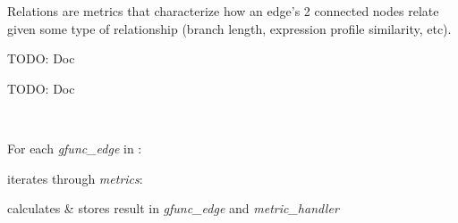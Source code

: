 \documentclass[letterpaper,10pt,english]{sphinxmanual}
\begin{document}

\begin{fulllineitems}
\label{code:gfunc.analysis_classes.RelationsHandler}
Relations are metrics that characterize how an
edge's 2 connected nodes relate given some type
of relationship (branch length, expression profile
similarity, etc).

\begin{fulllineitems}
\label{code:gfunc.analysis_classes.RelationsHandler.__init__}
TODO: Doc

\end{fulllineitems}


\begin{fulllineitems}
\label{code:gfunc.analysis_classes.RelationsHandler.get_vote_types}
TODO: Doc

\end{fulllineitems}


\begin{fulllineitems}
\label{code:gfunc.analysis_classes.RelationsHandler.measure_relations}~
\begin{DUlineblock}{0em}
\item[] For each \emph{gfunc\_edge} in :
\item[]
\begin{DUlineblock}{\DUlineblockindent}
\item[] iterates through \emph{metrics}:
\item[]
\begin{DUlineblock}{\DUlineblockindent}
\item[] calculates \& stores result in \emph{gfunc\_edge} and \emph{metric\_handler}
\end{DUlineblock}
\end{DUlineblock}
\end{DUlineblock}

\end{fulllineitems}


\end{fulllineitems}
\end{document}
